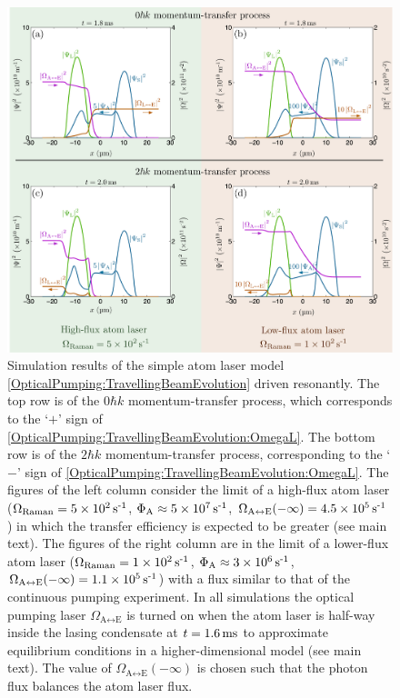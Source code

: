 \begin{figure}
    \centering
    \includegraphics[width=15cm]{TravellingBeamZeroDetuningResults}
    \caption{Simulation results of the simple atom laser model \eqref{OpticalPumping:TravellingBeamEvolution} driven resonantly.  
    The top row is of the $0\hbar k$ momentum-transfer process, which corresponds to the `$+$' sign of \eqref{OpticalPumping:TravellingBeamEvolution:OmegaL}.  
    The bottom row is of the $2\hbar k$ momentum-transfer process, corresponding to the `$-$' sign of \eqref{OpticalPumping:TravellingBeamEvolution:OmegaL}.  
    The figures of the left column consider the limit of a high-flux atom laser ($\Omega_\text{Raman} = 5 \times\unit[10^2]{s\textsuperscript{-1}}$, $\Phi_\text{A} \approx 5 \times \unit[10^7]{s\textsuperscript{-1}}$, $\Omega_{\text{A}\leftrightarrow\text{E}}(-\infty) = 4.5\times \unit[10^5]{s\textsuperscript{-1}}$) in which the transfer efficiency is expected to be greater (see main text).  
    The figures of the right column are in the limit of a lower-flux atom laser ($\Omega_\text{Raman} = 1 \times \unit[10^2]{s\textsuperscript{-1}}$, $\Phi_\text{A} \approx 3\times \unit[10^6]{s\textsuperscript{-1}}$, $\Omega_{\text{A}\leftrightarrow\text{E}}(-\infty) = 1.1\times\unit[10^5]{s\textsuperscript{-1}}$) with a flux similar to that of the continuous pumping experiment.  
    In all simulations the optical pumping laser $\Omega_{\text{A}\leftrightarrow\text{E}}$ is turned on when the atom laser is half-way inside the lasing condensate at $t=\unit[1.6]{ms}$ to approximate equilibrium conditions in a higher-dimensional model (see main text).  The value of $\Omega_{\text{A} \leftrightarrow \text{E}}(-\infty)$ is chosen such that the photon flux balances the atom laser flux.
}
\end{figure}
